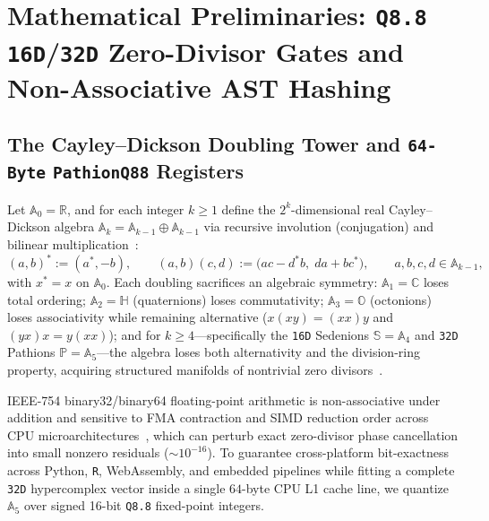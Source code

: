 \documentclass[11pt]{article}
\theoremstyle{plain}
\theoremstyle{definition}
\begin{document}
\section{Mathematical Preliminaries: \texttt{Q8.8} \texttt{16D}/\texttt{32D} Zero-Divisor Gates and Non-Associative AST Hashing}\label{sec:algebra}

\subsection{The Cayley--Dickson Doubling Tower and \texttt{64-Byte} \texttt{PathionQ88} Registers}

Let $\mathbb{A}_0 = \mathbb{R}$, and for each integer $k \ge 1$ define the $2^k$-dimensional real Cayley--Dickson algebra $\mathbb{A}_k = \mathbb{A}_{k-1} \oplus \mathbb{A}_{k-1}$ via recursive involution (conjugation) and bilinear multiplication~\cite{dickson1919,schafer1954}:
\begin{equation}\label{eq:cd_rec}
  (a, b)^* := (a^*, -b), \qquad (a, b)(c, d) := \bigl(ac - d^* b,\; da + b c^*\bigr), \qquad a,b,c,d \in \mathbb{A}_{k-1},
\end{equation}
with $x^* = x$ on $\mathbb{A}_0$. Each doubling sacrifices an algebraic symmetry: $\mathbb{A}_1 = \mathbb{C}$ loses total ordering; $\mathbb{A}_2 = \mathbb{H}$ (quaternions) loses commutativity; $\mathbb{A}_3 = \mathbb{O}$ (octonions) loses associativity while remaining alternative ($x(xy) = (xx)y$ and $(yx)x = y(xx)$); and for $k \ge 4$---specifically the \texttt{16D} Sedenions $\mathbb{S} = \mathbb{A}_4$ and \texttt{32D} Pathions $\mathbb{P} = \mathbb{A}_5$---the algebra loses both alternativity and the division-ring property, acquiring structured manifolds of nontrivial zero divisors~\cite{schafer1954,moreno1998,demarrais2000,demarrais2002}.

IEEE-754 binary32/binary64 floating-point arithmetic is non-associative under addition and sensitive to FMA contraction and SIMD reduction order across CPU microarchitectures~\cite{goldberg1991float}, which can perturb exact zero-divisor phase cancellation into small nonzero residuals ($\sim 10^{-16}$). To guarantee cross-platform bit-exactness across Python, \texttt{R}, WebAssembly, and embedded pipelines while fitting a complete \texttt{32D} hypercomplex vector inside a single $64$-byte CPU L1 cache line, we quantize $\mathbb{A}_5$ over signed 16-bit \texttt{Q8.8} fixed-point integers.
\end{document}
